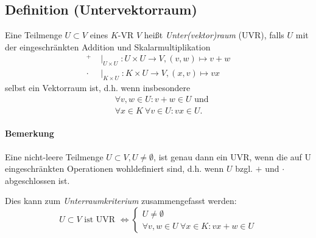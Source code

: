 \subsection{Definition (Untervektorraum)}
	\begin{Definition}[Untervektorraum]
		Eine Teilmenge $U\subset V$ eines $K$-VR $V$ heißt \emph{Unter(vektor)raum} (UVR), falls $U$ mit der eingeschränkten Addition und Skalarmultiplikation
                \begin{align*}
                        ^+    & \mid_{U\times U}: U\times U \to V,(v,w) \mapsto v+w \\
                        \cdot & \mid_{K\times U}: K\times U \to V,(x,v) \mapsto vx
                \end{align*}
                selbst ein Vektorraum ist, d.h. wenn insbesondere
                \begin{align*}
                        &\forall v,w \in U: v+w\in U \text{ und}\\
                        &\forall x\in K\ \forall v\in U: vx\in U.
                \end{align*}
	\end{Definition}

\paragraph{Bemerkung}
	Eine nicht-leere Teilmenge $U\subset V, U\neq\emptyset$, ist genau dann ein UVR, wenn die auf U eingeschränkten Operationen wohldefiniert sind, d.h. wenn $ U $ bzgl. $ + $ und $ \cdot $ abgeschlossen ist.

	Dies kann zum \emph{Unterraumkriterium} zusammengefasst werden:
	\begin{equation*}
		U\subset V \text{ ist UVR }\Leftrightarrow 
 		 \begin{cases}
 		 	U\neq\emptyset\\
 		 	\forall v,w\in U\ \forall x\in K: vx+w\in U
 		 \end{cases}
	\end{equation*}

